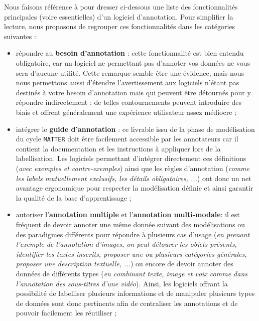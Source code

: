 		Nous faisons référence à \cite{finlayson-erjavec:2016:overview-annotation-creation} pour dresser ci-dessous une liste des fonctionnalités principales (voire essentielles) d'un logiciel d'annotation.
		Pour simplifier la lecture, nous proposons de regrouper ces fonctionnalités dans les catégories suivantes :
		\begin{itemize}
			\item répondre au \textbf{besoin d'annotation} :
				cette fonctionnalité est bien entendu obligatoire, car un logiciel ne permettant pas d'annoter vos données ne vous sera d'aucune utilité.
				Cette remarque semble être une évidence, mais nous nous permettons aussi d'étendre l’avertissement aux logiciels n'étant pas destinés à votre besoin d'annotation mais qui peuvent être détournés pour y répondre indirectement : de telles contournements peuvent introduire des biais et offrent généralement une expérience utilisateur assez médiocre ;
			\item intégrer le \textbf{guide d'annotation} :
				ce livrable issu de la phase de modélisation du cycle \texttt{MATTER} doit être facilement accessible par les annotateurs car il contient la documentation et les instructions à appliquer lors de la labellisation.
				Les logiciels permettant d'intégrer directement ces définitions (\textit{avec exemples et contre-exemples}) ainsi que les règles d'annotation (\textit{comme les labels mutuellement exclusifs, les détails obligatoires, ...}) ont donc un net avantage ergonomique pour respecter la modélisation définie et ainsi garantir la qualité de la base d'apprentissage ; 
			\item autoriser l'\textbf{annotation multiple} et l'\textbf{annotation multi-modale}: 
				il est fréquent de devoir annoter une même donnée suivant des modélisations ou des paradigmes différents pour répondre à plusieurs cas d'usage (\textit{en prenant l'exemple de l'annotation d'images, on peut détourer les objets présents, identifier les textes inscrits, proposer une ou plusieurs catégories générales, proposer une description textuelle, ...}) ou encore de devoir annoter des données de différents types (\textit{en combinant texte, image et voix comme dans l'annotation des sous-titres d'une vidéo}).
				Ainsi, les logiciels offrant la possibilité de labelliser plusieurs informations et de manipuler plusieurs types de données sont donc pertinents afin de centraliser les annotations et de pouvoir facilement les réutiliser ;

\end{itemize}
